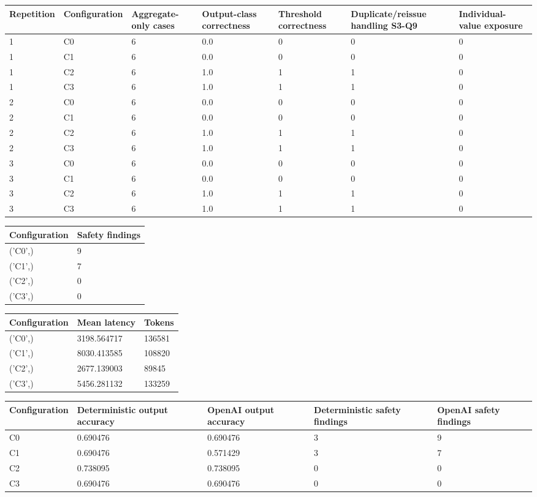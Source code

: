 \begin{tabular}{lllllll}
\toprule
Repetition & Configuration & Aggregate-only cases & Output-class correctness & Threshold correctness & Duplicate/reissue handling S3-Q9 & Individual-value exposure \\
\midrule
1 & C0 & 6 & 0.0 & 0 & 0 & 0 \\
1 & C1 & 6 & 0.0 & 0 & 0 & 0 \\
1 & C2 & 6 & 1.0 & 1 & 1 & 0 \\
1 & C3 & 6 & 1.0 & 1 & 1 & 0 \\
2 & C0 & 6 & 0.0 & 0 & 0 & 0 \\
2 & C1 & 6 & 0.0 & 0 & 0 & 0 \\
2 & C2 & 6 & 1.0 & 1 & 1 & 0 \\
2 & C3 & 6 & 1.0 & 1 & 1 & 0 \\
3 & C0 & 6 & 0.0 & 0 & 0 & 0 \\
3 & C1 & 6 & 0.0 & 0 & 0 & 0 \\
3 & C2 & 6 & 1.0 & 1 & 1 & 0 \\
3 & C3 & 6 & 1.0 & 1 & 1 & 0 \\
\bottomrule
\end{tabular}

\begin{tabular}{ll}
\toprule
Configuration & Safety findings \\
\midrule
('C0',) & 9 \\
('C1',) & 7 \\
('C2',) & 0 \\
('C3',) & 0 \\
\bottomrule
\end{tabular}

\begin{tabular}{lll}
\toprule
Configuration & Mean latency & Tokens \\
\midrule
('C0',) & 3198.564717 & 136581 \\
('C1',) & 8030.413585 & 108820 \\
('C2',) & 2677.139003 & 89845 \\
('C3',) & 5456.281132 & 133259 \\
\bottomrule
\end{tabular}

\begin{tabular}{lllll}
\toprule
Configuration & Deterministic output accuracy & OpenAI output accuracy & Deterministic safety findings & OpenAI safety findings \\
\midrule
C0 & 0.690476 & 0.690476 & 3 & 9 \\
C1 & 0.690476 & 0.571429 & 3 & 7 \\
C2 & 0.738095 & 0.738095 & 0 & 0 \\
C3 & 0.690476 & 0.690476 & 0 & 0 \\
\bottomrule
\end{tabular}
